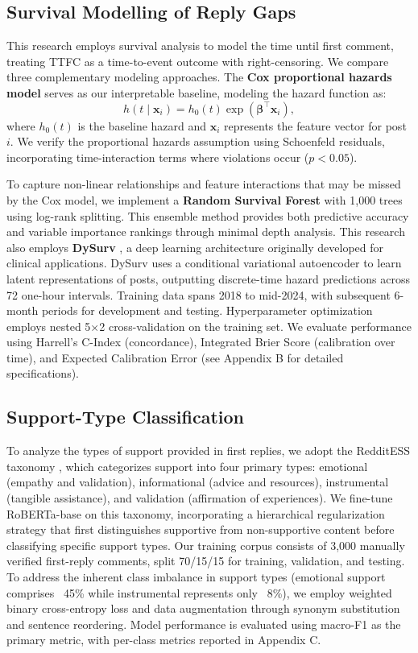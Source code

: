 \documentclass[letterpaper]{article} %
\begin{document}
\subsection{Survival Modelling of Reply Gaps}

This research employs survival analysis to model the time until first comment, treating TTFC as a time-to-event outcome with right-censoring. We compare three complementary modeling approaches. The \textbf{Cox proportional hazards model} serves as our interpretable baseline, modeling the hazard function as:
\begin{equation}
h(t\mid\mathbf{x}_i) = h_0(t)\exp(\boldsymbol{\beta}^{\top}\mathbf{x}_i),
\end{equation}
where $h_0(t)$ is the baseline hazard and $\mathbf{x}_i$ represents the feature vector for post $i$. We verify the proportional hazards assumption using Schoenfeld residuals, incorporating time-interaction terms where violations occur ($p < 0.05$).

To capture non-linear relationships and feature interactions that may be missed by the Cox model, we implement a \textbf{Random Survival Forest} \citep{fantazzini2009random} with 1,000 trees using log-rank splitting. This ensemble method provides both predictive accuracy and variable importance rankings through minimal depth analysis. This research also employs \textbf{DySurv} \citep{mesinovic2024dysurv}, a deep learning architecture originally developed for clinical applications. DySurv uses a conditional variational autoencoder to learn latent representations of posts, outputting discrete-time hazard predictions across 72 one-hour intervals. Training data spans 2018 to mid-2024, with subsequent 6-month periods for development and testing. Hyperparameter optimization employs nested 5×2 cross-validation on the training set. We evaluate performance using Harrell's C-Index (concordance), Integrated Brier Score (calibration over time), and Expected Calibration Error (see Appendix B for detailed specifications).
\subsection{Support-Type Classification}
To analyze the types of support provided in first replies, we adopt the RedditESS taxonomy \citep{alghamdi2025redditess}, which categorizes support into four primary types: emotional (empathy and validation), informational (advice and resources), instrumental (tangible assistance), and validation (affirmation of experiences). We fine-tune RoBERTa-base on this taxonomy, incorporating a hierarchical regularization strategy that first distinguishes supportive from non-supportive content before classifying specific support types. Our training corpus consists of 3,000 manually verified first-reply comments, split 70/15/15 for training, validation, and testing. To address the inherent class imbalance in support types (emotional support comprises ~45\% while instrumental represents only ~8\%), we employ weighted binary cross-entropy loss and data augmentation through synonym substitution and sentence reordering. Model performance is evaluated using macro-F1 as the primary metric, with per-class metrics reported in Appendix C.
\end{document}

